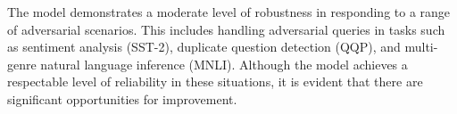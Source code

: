 The model demonstrates a moderate level of robustness in responding to a range of adversarial scenarios. This includes handling adversarial queries in tasks such as sentiment analysis (SST-2), duplicate question detection (QQP), and multi-genre natural language inference (MNLI). Although the model achieves a respectable level of reliability in these situations, it is evident that there are significant opportunities for improvement.